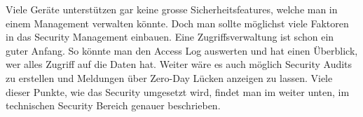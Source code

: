 Viele Geräte unterstützen gar keine grosse Sicherheitsfeatures, welche man in einem Management verwalten könnte. Doch man sollte möglichst viele Faktoren in das Security Management einbauen.
Eine Zugriffsverwaltung ist schon ein guter Anfang. So könnte man den Access Log auswerten und hat einen Überblick, wer alles Zugriff auf die Daten hat. Weiter wäre es auch möglich Security Audits zu erstellen und Meldungen über Zero-Day Lücken anzeigen zu lassen. Viele dieser Punkte, wie das Security umgesetzt wird, findet man im weiter unten, im technischen Security Bereich genauer beschrieben.



\section{}